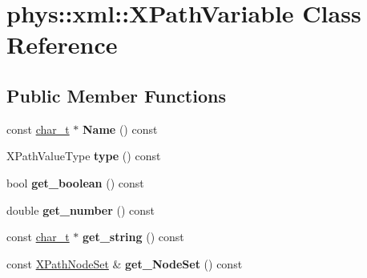 \hypertarget{classphys_1_1xml_1_1XPathVariable}{
\section{phys::xml::XPathVariable Class Reference}
\label{df/dee/classphys_1_1xml_1_1XPathVariable}
}
\subsection*{Public Member Functions}
\begin{DoxyCompactItemize}
\item 
\hypertarget{classphys_1_1xml_1_1XPathVariable_af51c0a3362e130e30df85068ab95de63}{
const \hyperlink{namespacephys_1_1xml_afc87705cd1c2917d87b879715a2d8f6e}{char\_\-t} $\ast$ {\bfseries Name} () const }
\label{df/dee/classphys_1_1xml_1_1XPathVariable_af51c0a3362e130e30df85068ab95de63}

\item 
\hypertarget{classphys_1_1xml_1_1XPathVariable_a7d288fe2bbf176e39cb80832bf414daa}{
XPathValueType {\bfseries type} () const }
\label{df/dee/classphys_1_1xml_1_1XPathVariable_a7d288fe2bbf176e39cb80832bf414daa}

\item 
\hypertarget{classphys_1_1xml_1_1XPathVariable_a8e879dfdd22d4e4cd00f79580de98068}{
bool {\bfseries get\_\-boolean} () const }
\label{df/dee/classphys_1_1xml_1_1XPathVariable_a8e879dfdd22d4e4cd00f79580de98068}

\item 
\hypertarget{classphys_1_1xml_1_1XPathVariable_a8d8ee4ea7868cbf76f2f926374ac5cab}{
double {\bfseries get\_\-number} () const }
\label{df/dee/classphys_1_1xml_1_1XPathVariable_a8d8ee4ea7868cbf76f2f926374ac5cab}

\item 
\hypertarget{classphys_1_1xml_1_1XPathVariable_a045574b064274e4b74e16b1e9e555991}{
const \hyperlink{namespacephys_1_1xml_afc87705cd1c2917d87b879715a2d8f6e}{char\_\-t} $\ast$ {\bfseries get\_\-string} () const }
\label{df/dee/classphys_1_1xml_1_1XPathVariable_a045574b064274e4b74e16b1e9e555991}

\item 
\hypertarget{classphys_1_1xml_1_1XPathVariable_a42aac5e1ef0d8231bc50dc6304738e62}{
const \hyperlink{classphys_1_1xml_1_1XPathNodeSet}{XPathNodeSet} \& {\bfseries get\_\-NodeSet} () const }
\label{df/dee/classphys_1_1xml_1_1XPathVariable_a42aac5e1ef0d8231bc50dc6304738e62}


\end{DoxyCompactItemize}
